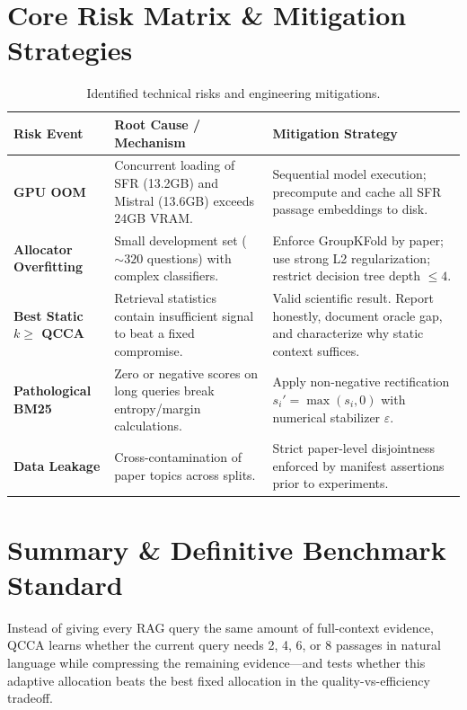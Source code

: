 \documentclass[11pt,a4paper]{article}
\begin{document}
\section{Core Risk Matrix \& Mitigation Strategies}
\begin{table}[h]
\centering
\small
\begin{tabularx}{\textwidth}{lp{6cm}p{7.5cm}}
\toprule
\textbf{Risk Event} & \textbf{Root Cause / Mechanism} & \textbf{Mitigation Strategy} \\
\midrule
\textbf{GPU OOM} & Concurrent loading of SFR (13.2GB) and Mistral (13.6GB) exceeds 24GB VRAM. & Sequential model execution; precompute and cache all SFR passage embeddings to disk. \\
\addlinespace[2pt]
\textbf{Allocator Overfitting} & Small development set ($\sim 320$ questions) with complex classifiers. & Enforce GroupKFold by paper; use strong L2 regularization; restrict decision tree depth $\le 4$. \\
\addlinespace[2pt]
\textbf{Best Static $k \ge$ QCCA} & Retrieval statistics contain insufficient signal to beat a fixed compromise. & Valid scientific result. Report honestly, document oracle gap, and characterize why static context suffices. \\
\addlinespace[2pt]
\textbf{Pathological BM25} & Zero or negative scores on long queries break entropy/margin calculations. & Apply non-negative rectification $s_i' = \max(s_i, 0)$ with numerical stabilizer $\varepsilon$. \\
\addlinespace[2pt]
\textbf{Data Leakage} & Cross-contamination of paper topics across splits. & Strict paper-level disjointness enforced by manifest assertions prior to experiments. \\
\bottomrule
\end{tabularx}
\caption{Identified technical risks and engineering mitigations.}
\end{table}

\section{Summary \& Definitive Benchmark Standard}
\begin{summarybox}
Instead of giving every RAG query the same amount of full-context evidence, QCCA learns whether the current query needs 2, 4, 6, or 8 passages in natural language while compressing the remaining evidence—and tests whether this adaptive allocation beats the best fixed allocation in the quality-vs-efficiency tradeoff.
\end{summarybox}
\end{document}
